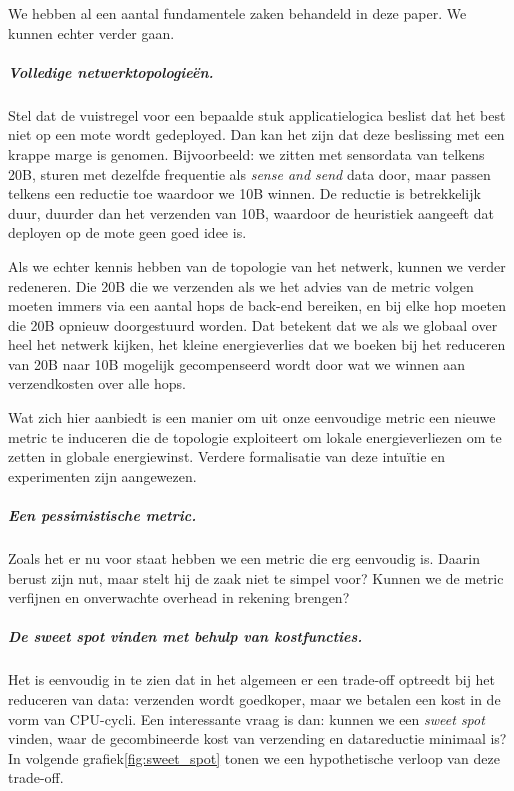 \documentclass[11pt]{article}
\begin{document}
We hebben al een aantal fundamentele zaken behandeld in deze paper. We kunnen
echter verder gaan.
 
\subparagraph{Volledige netwerktopologie\"en.}

Stel dat de vuistregel voor een bepaalde stuk applicatielogica beslist dat het
best niet op een mote wordt gedeployed. Dan kan het zijn dat deze beslissing met
een krappe marge is genomen. Bijvoorbeeld: we zitten met sensordata van telkens
20B, sturen met dezelfde frequentie als \textit{sense and send} data door, maar
passen telkens een reductie toe waardoor we 10B winnen. De reductie is
betrekkelijk duur, duurder dan het verzenden van 10B, waardoor de heuristiek
aangeeft dat deployen op de mote geen goed idee is. 

Als we echter kennis hebben van de topologie van het netwerk, kunnen we verder
redeneren. Die 20B die we verzenden als we het advies van de metric volgen
moeten immers via een aantal hops de back-end bereiken, en bij elke hop moeten
die 20B opnieuw doorgestuurd worden. Dat betekent dat we als we globaal over
heel het netwerk kijken, het kleine energieverlies dat we boeken bij het
reduceren van 20B naar 10B mogelijk gecompenseerd wordt door wat we winnen aan
verzendkosten over alle hops.

Wat zich hier aanbiedt is een manier om uit onze eenvoudige metric een nieuwe
metric te induceren die de topologie exploiteert om lokale energieverliezen om
te zetten in globale energiewinst. Verdere formalisatie van deze intu\"itie en
experimenten zijn aangewezen.

\subparagraph{Een pessimistische metric.}

Zoals het er nu voor staat hebben we een metric die erg eenvoudig is. Daarin
berust zijn nut, maar stelt hij de zaak niet te simpel voor? Kunnen we de metric
verfijnen en onverwachte overhead in rekening brengen? 




\subparagraph{De \textit{sweet spot} vinden met behulp van kostfuncties.}

Het is eenvoudig in te zien dat in het algemeen er een trade-off optreedt
bij het reduceren van data: verzenden wordt goedkoper, maar we betalen een kost
in de vorm van CPU-cycli. Een interessante vraag is dan: kunnen we een
\textit{sweet spot} vinden, waar de gecombineerde kost van verzending en
datareductie minimaal is?
\\
In volgende grafiek\ref{fig:sweet_spot} tonen we een hypothetische verloop van deze trade-off.
\end{document}
